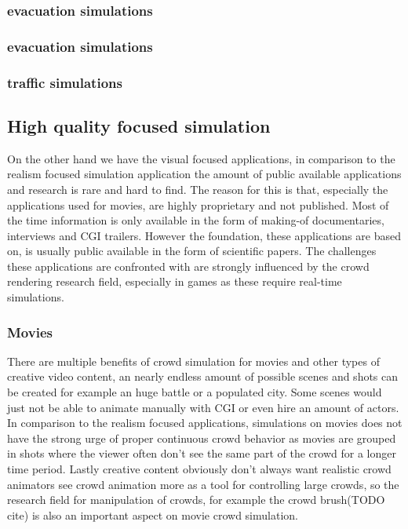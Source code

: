 \documentclass[sigconf]{acmart}
\begin{document}
\subsubsection{evacuation simulations}
\subsubsection{evacuation simulations}
\subsubsection{traffic simulations}


\subsection{High quality focused simulation}

On the other hand we have the visual focused applications, in comparison to the realism focused simulation application the amount of public available applications and research is rare and hard to find. The reason for this is that, especially the applications used for movies, are highly proprietary and not published. Most of the time information is only available in the form of making-of documentaries, interviews and CGI trailers. 
However the foundation, these applications are based on, is usually public available in the form of scientific papers. The challenges these applications are confronted with are strongly influenced by the crowd rendering research field, especially in games as these require real-time simulations. \cite{thalmann_crowd_2013}

\subsubsection{Movies}

There are multiple benefits of crowd simulation for movies and other types of creative video content, an nearly endless amount of possible scenes and shots can be created for example an huge battle or a populated city. Some scenes would just not be able to animate manually with CGI or even hire an amount of actors. In comparison to the realism focused applications, simulations on movies does not have the strong urge of proper continuous crowd behavior as movies are grouped in shots where the viewer often don't see the same part of the crowd for a longer time period. Lastly creative content obviously don't always want realistic crowd animators see crowd animation more as a tool for controlling large crowds, so the research field for manipulation of crowds, for example the crowd brush(TODO cite) is also an important aspect on movie crowd simulation.
\end{document}
